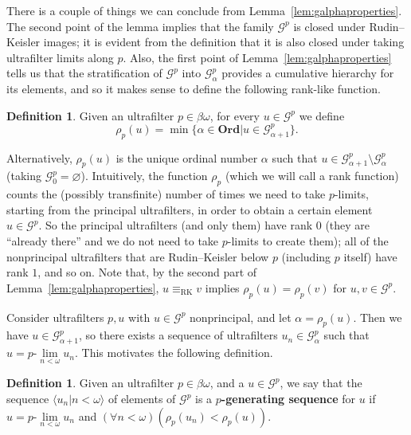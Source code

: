 \documentclass[10pt]{amsart}
\newcommand{\ulim}[2]{#1\text{-}\lim\limits_{#2<\omega}}
\newcommand{\eqrk}[2]{#1\equiv_{\mathrm{RK}}#2}
\newcommand{\ord}{\mathbf{Ord}}
\theoremstyle{definition}
\newtheorem{definition}[theorem]{Definition}
\theoremstyle{remark}
\begin{document}
There is a couple of things we can conclude from Lemma~\ref{lem:galphaproperties}. The second point of the lemma implies that the family $\mathscr G^p$ is closed under Rudin--Keisler images; it is evident from the definition that it is also closed under taking ultrafilter limits along $p$. Also, the first point of Lemma~\ref{lem:galphaproperties} tells us that the stratification of $\mathscr G^p$ into $\mathscr G_\alpha^p$ provides a cumulative hierarchy for its elements, and so it makes sense to define the following rank-like function.

\begin{definition}
Given an ultrafilter $p\in\beta\omega$, for every $u\in\mathscr G^p$ we define
\begin{equation*}
    \rho_p(u)=\min\{\alpha\in\ord\big|u\in\mathscr G_{\alpha+1}^p\}.
\end{equation*}
\end{definition}

Alternatively, $\rho_p(u)$ is the unique ordinal number $\alpha$ such that $u\in\mathscr G_{\alpha+1}^p\setminus\mathscr G_\alpha^p$ (taking $\mathscr G_0^p=\varnothing$). Intuitively, the function $\rho_p$ (which we will call a rank function) counts the (possibly transfinite) number of times we need to take $p$-limits, starting from the principal ultrafilters, in order to obtain a certain element $u\in\mathscr G^p$. So the principal ultrafilters (and only them) have rank 0 (they are ``already there'' and we do not need to take $p$-limits to create them); all of the nonprincipal ultrafilters that are Rudin--Keisler below $p$ (including $p$ itself) have rank $1$, and so on. Note that, by the second part of Lemma~\ref{lem:galphaproperties}, $\eqrk{u}{v}$ implies $\rho_p(u)=\rho_p(v)$ for $u,v\in\mathscr G^p$.

Consider ultrafilters $p,u$ with $u\in\mathscr G^p$ nonprincipal, and let $\alpha=\rho_p(u)$. Then we have $u\in\mathscr G_{\alpha+1}^p$, so there exists a sequence of ultrafilters $u_n\in\mathscr G_\alpha^p$ such that $u=\ulim{p}{n}u_n$. This motivates the following definition.

\begin{definition}\label{def:gen-seq}
Given an ultrafilter $p\in\beta\omega$, and a $u\in\mathscr G^p$, we say that the sequence $\langle u_n\big|n<\omega\rangle$ of elements of $\mathscr G^p$ is a {\bf $p$-generating sequence} for $u$ if $u=\ulim{p}{n}u_n$ and $(\forall n<\omega)(\rho_p(u_n)<\rho_p(u))$.
\end{definition}
\end{document}
